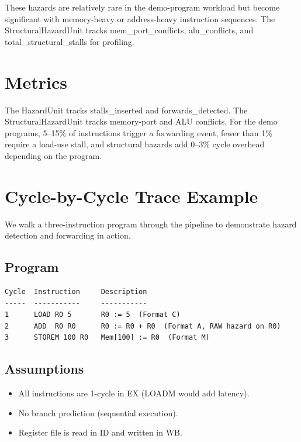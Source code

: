 \documentclass[12pt,a4paper,twoside]{book}
\theoremstyle{trinarytheorem}
\theoremstyle{trinarydefinition}
\newcommand{\code}[1]{\textsf{#1}}
\begin{document}
These hazards are relatively rare in the demo-program workload but
become significant with memory-heavy or address-heavy instruction
sequences. The \code{StructuralHazardUnit} tracks \code{mem\_port\_conflicts},
\code{alu\_conflicts}, and \code{total\_structural\_stalls} for profiling.

\section{Metrics}

The \code{HazardUnit} tracks \code{stalls\_inserted} and
\code{forwards\_detected}. The \code{StructuralHazardUnit} tracks
memory-port and ALU conflicts. For the demo programs, 5--15\% of
instructions trigger a forwarding event, fewer than 1\% require
a load-use stall, and structural hazards add 0--3\% cycle overhead
depending on the program.

\section{Cycle-by-Cycle Trace Example}

We walk a three-instruction program through the pipeline to demonstrate
hazard detection and forwarding in action.

\subsection{Program}

\begin{verbatim}
Cycle  Instruction     Description
-----  -----------     -----------
1      LOAD R0 5       R0 := 5  (Format C)
2      ADD  R0 R0      R0 := R0 + R0  (Format A, RAW hazard on R0)
3      STOREM 100 R0   Mem[100] := R0  (Format M)
\end{verbatim}

\subsection{Assumptions}

\begin{itemize}
    \item All instructions are 1-cycle in EX (LOADM would add latency).
    \item No branch prediction (sequential execution).
    \item Register file is read in ID and written in WB.
\end{itemize}
\end{document}
